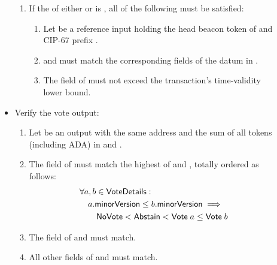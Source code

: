 \documentclass[../hydrozoa.tex]{subfiles}
\begin{document}
\begin{description}
\begin{itemize}
        \begin{enumerate}[resume]
          \item If the  of either  or  is , all of the following must be satisfied:
            \begin{enumerate}
              \item Let  be a reference input holding the head beacon token of  and CIP-67 prefix .
              \item {} and  must match the corresponding fields of the  datum in .
              \item The  field of  must not exceed the transaction's time-validity lower bound.
            \end{enumerate}
        \end{enumerate}
      \item Verify the vote output:
        \begin{enumerate}[resume]
          \item Let  be an output with the same address and the sum of all tokens (including ADA) in  and .
          \item The  field of  must match the highest  of  and , totally ordered as follows:
            \begin{equation*}
            \begin{split}
              &\forall a, b \in \mathsf{VoteDetails}:\\
              &\quad a \mathsf{.minorVersion} \leq b \mathsf{.minorVersion} \implies\\
              &\qquad \mathsf{NoVote} < \mathsf{Abstain} < \mathsf{Vote} \; a \leq \mathsf{Vote} \; b  
            \end{split}
            \end{equation*}
          \item The  field of  and  must match.
          \item All other fields of  and  must match.
        \end{enumerate}
    \end{itemize}
\end{description}
\end{document}
